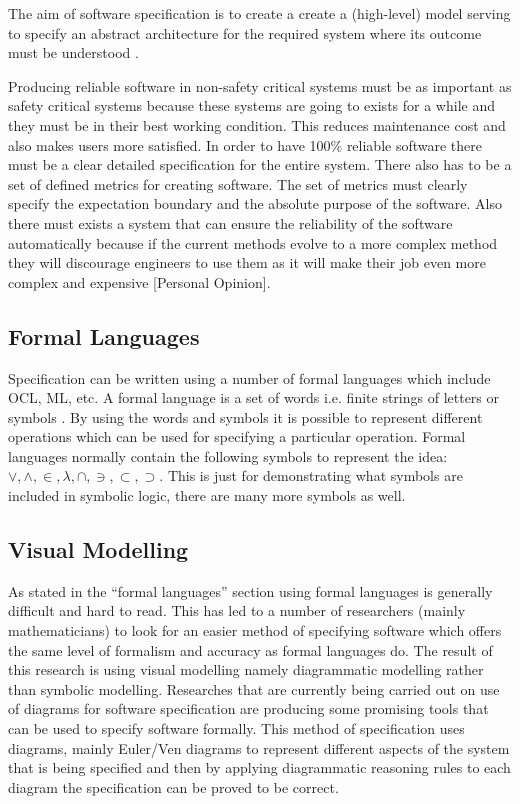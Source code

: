 \documentclass[a4paper]{article}
\begin{document}
The aim of software specification is to create a create a (high-level) model serving to specify an abstract architecture for the required system where its outcome must be understood \cite{Howse_2005}. 

Producing reliable software in non-safety critical systems must be as important as safety critical systems because these systems are going to exists for a while and they must be in their best working condition. This reduces maintenance cost and also makes users more satisfied. In order to have 100\% reliable software there must be a clear detailed specification for the entire system. There also has to be a set of defined metrics for creating software. The set of metrics must clearly specify the expectation boundary and the absolute purpose of the software. Also there must  exists a system that can ensure the reliability of the software automatically because if the current methods evolve to a more complex method they will discourage engineers to use them as it will make their job even more complex and expensive [Personal Opinion].


\subsection{Formal Languages}

Specification can be written using a number of formal languages which include OCL, ML, etc. A formal language is a set of words i.e. finite strings of letters or symbols \cite{Mateescu_1997}. By using the words and symbols it is possible to represent different operations which can be used for specifying a particular operation.
\linebreak 
Formal languages normally contain the following symbols to represent the idea: $\vee, \wedge, \in, \lambda, \cap, \ni, \subset, \supset$. This is just for demonstrating what symbols are included in symbolic logic, there are many more symbols as well. 

\subsection{Visual Modelling}
 
As stated in the “formal languages” section using formal languages is generally difficult and hard to read. This has led to a number of researchers (mainly mathematicians) to look for an easier method of specifying software which offers the same level of formalism and accuracy as formal languages do. The result of this research is using visual modelling namely diagrammatic modelling rather than symbolic modelling. Researches that are currently being carried out on use of diagrams for  software specification are producing some promising tools that can be used to specify software formally. This method of specification uses diagrams, mainly Euler/Ven diagrams to represent different aspects of  the system that is being specified and then by applying diagrammatic reasoning rules to each diagram the specification can be proved to be correct.
 
\end{document}
